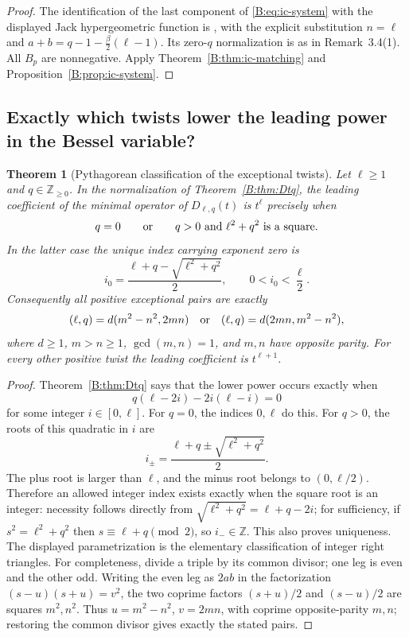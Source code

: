 \documentclass[11pt,a4paper]{article}
\newtheorem{theorem}{Theorem}[section]
\theoremstyle{definition}
\theoremstyle{remark}
\numberwithin{equation}{section}
\begin{document}
\begin{proof}
The identification of the last component of \eqref{B:eq:ic-system}
with the displayed Jack hypergeometric function is
\cite[Proposition~3.3]{FW26}, with the explicit substitution
$n=\ell$ and $a+b=q-1-\frac\beta2(\ell-1)$.
Its zero-$q$ normalization is as in Remark~3.4(1).
All $B_p$ are nonnegative.  Apply
Theorem~\ref{B:thm:ic-matching} and Proposition~\ref{B:prop:ic-system}.
\end{proof}

\subsection{Exactly which twists lower the leading power in the Bessel variable?}

\begin{theorem}[Pythagorean classification of the exceptional twists]
\label{B:thm:ic-pythagorean}
Let $\ell\ge1$ and $q\in\mathbb Z_{\ge0}$.  In the normalization of
Theorem~\ref{B:thm:Dtq}, the leading coefficient of the minimal operator of
$D_{\ell,q}(t)$ is $t^\ell$ precisely when
\[
 q=0\qquad\hbox{or}\qquad q>0\ \hbox{and}\ \ell^2+q^2\ \hbox{is a square}.
\]
In the latter case the unique index carrying exponent zero is
\[
 i_0=\frac{\ell+q-\sqrt{\ell^2+q^2}}{2},\qquad 0<i_0<\frac\ell2.
\]
Consequently all positive exceptional pairs are exactly
\[
 (\ell,q)=d(m^2-n^2,2mn)\quad\hbox{or}\quad
 (\ell,q)=d(2mn,m^2-n^2),
\]
where $d\ge1$, $m>n\ge1$, $\gcd(m,n)=1$, and $m,n$ have opposite parity.
For every other positive twist the leading coefficient is $t^{\ell+1}$.
\end{theorem}

\begin{proof}
Theorem~\ref{B:thm:Dtq} says that the lower power occurs exactly when
\[
 q(\ell-2i)-2i(\ell-i)=0
\]
for some integer $i\in[0,\ell]$.  For $q=0$, the indices $0,\ell$ do
this.  For $q>0$, the roots of this quadratic in $i$ are
\[
 i_\pm=\frac{\ell+q\pm\sqrt{\ell^2+q^2}}2.
\]
The plus root is larger than $\ell$, and the minus root belongs to
$(0,\ell/2)$.  Therefore an allowed integer index exists exactly when
the square root is an integer: necessity follows directly from
$\sqrt{\ell^2+q^2}=\ell+q-2i$; for sufficiency, if $s^2=\ell^2+q^2$
then $s\equiv\ell+q\pmod2$, so $i_-\in\mathbb Z$.  This also proves
uniqueness.  The displayed parametrization is the elementary classification
of integer right triangles.  For completeness, divide a triple by its
common divisor; one leg is even and the other odd.  Writing the even leg
as $2ab$ in the factorization $(s-u)(s+u)=v^2$, the two coprime factors
$(s+u)/2$ and $(s-u)/2$ are squares $m^2,n^2$.  Thus
$u=m^2-n^2$, $v=2mn$, with coprime opposite-parity $m,n$; restoring
the common divisor gives exactly the stated pairs.
\end{proof}
\end{document}
